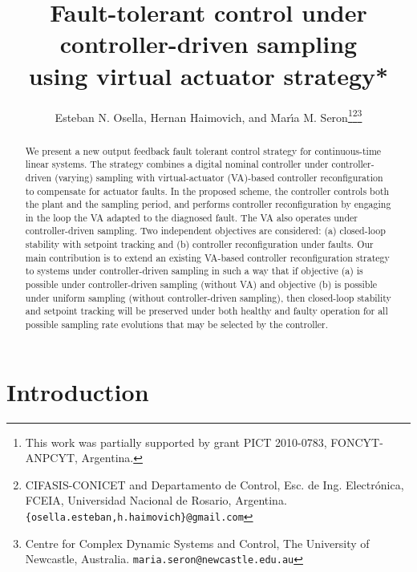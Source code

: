 \documentclass[letterpaper, 10 pt, conference]{ieeeconf}
\title{\LARGE \bf Fault-tolerant control under controller-driven
  sampling\\ using virtual actuator strategy*}
\author{Esteban N. Osella, Hernan Haimovich, and Mar\'{\i}a M. Seron\thanks{This work was partially supported by grant PICT 2010-0783, FONCYT-ANPCYT, Argentina.}\thanks{ CIFASIS-CONICET and Departamento de Control, Esc. de Ing. Electr\'onica, FCEIA, Universidad Nacional de Rosario, Argentina. {\tt\small \{osella.esteban,h.haimovich\}@gmail.com}}\thanks{ Centre for Complex Dynamic Systems and Control, The University of Newcastle, Australia.
 {\tt\small maria.seron@newcastle.edu.au}}}
\begin{document}
\maketitle \thispagestyle{empty} \pagestyle{empty}


\begin{abstract}
  We present a new output feedback fault tolerant control strategy for
  continuous-time linear systems. The strategy combines a digital
  nominal controller under controller-driven (varying) sampling with
  virtual-actuator (VA)-based controller reconfiguration to compensate
  for actuator faults.  In the proposed scheme, the controller
  controls both the plant and the sampling period, and performs
  controller reconfiguration by engaging in the loop the VA adapted to
  the diagnosed fault. The VA also operates under controller-driven
  sampling.  Two independent objectives are considered: (a)
  closed-loop stability with setpoint tracking and (b) controller
  reconfiguration under faults. Our main contribution is to extend an
  existing VA-based controller reconfiguration strategy to systems
  under controller-driven sampling in such a way that if objective (a)
  is possible under controller-driven sampling (without VA) and
  objective (b) is possible under uniform sampling (without
  controller-driven sampling), then closed-loop stability and setpoint
  tracking will be preserved under both healthy and faulty operation
  for all possible sampling rate evolutions that may be selected by
  the controller.
\end{abstract}


\section{Introduction}
\label{sec:intro}
\end{document}
